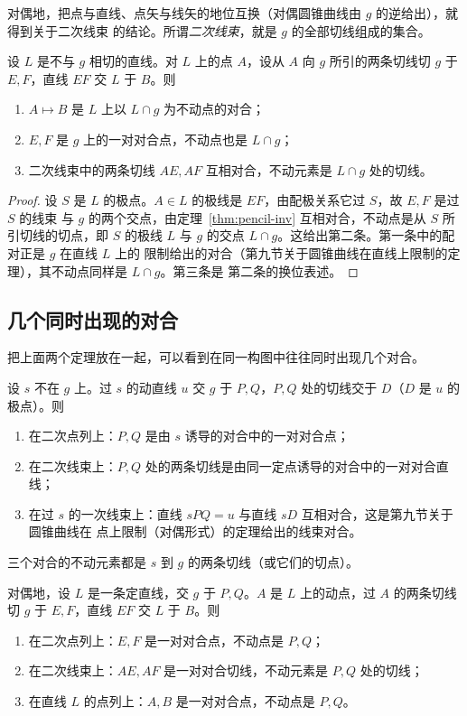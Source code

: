 对偶地，把点与直线、点矢与线矢的地位互换（对偶圆锥曲线由 $g$ 的逆给出），就得到关于二次线束
的结论。所谓\emph{二次线束}，就是 $g$ 的全部切线组成的集合。

\begin{theorem}[定直线上的点列]\label{thm:linerange-inv}
设 $L$ 是不与 $g$ 相切的直线。对 $L$ 上的点 $A$，设从 $A$ 向 $g$ 所引的两条切线切 $g$ 于
$E,F$，直线 $EF$ 交 $L$ 于 $B$。则
\begin{enumerate}
\item $A\mapsto B$ 是 $L$ 上以 $L\cap g$ 为不动点的对合；
\item $E,F$ 是 $g$ 上的一对对合点，不动点也是 $L\cap g$；
\item 二次线束中的两条切线 $AE,AF$ 互相对合，不动元素是 $L\cap g$ 处的切线。
\end{enumerate}
\end{theorem}

\begin{proof}
设 $S$ 是 $L$ 的极点。$A\in L$ 的极线是 $EF$，由配极关系它过 $S$，故 $E,F$ 是过 $S$ 的线束
与 $g$ 的两个交点，由定理~\ref{thm:pencil-inv} 互相对合，不动点是从 $S$ 所引切线的切点，即
$S$ 的极线 $L$ 与 $g$ 的交点 $L\cap g$。这给出第二条。第一条中的配对正是 $g$ 在直线 $L$ 上的
限制给出的对合（第九节关于圆锥曲线在直线上限制的定理），其不动点同样是 $L\cap g$。第三条是
第二条的换位表述。
\end{proof}

\subsection{几个同时出现的对合}

把上面两个定理放在一起，可以看到在同一构图中往往同时出现几个对合。

设 $s$ 不在 $g$ 上。过 $s$ 的动直线 $u$ 交 $g$ 于 $P,Q$，$P,Q$ 处的切线交于 $D$（$D$ 是 $u$
的极点）。则
\begin{enumerate}
\item 在二次点列上：$P,Q$ 是由 $s$ 诱导的对合中的一对对合点；
\item 在二次线束上：$P,Q$ 处的两条切线是由同一定点诱导的对合中的一对对合直线；
\item 在过 $s$ 的一次线束上：直线 $sPQ=u$ 与直线 $sD$ 互相对合，这是第九节关于圆锥曲线在
点上限制（对偶形式）的定理给出的线束对合。
\end{enumerate}
三个对合的不动元素都是 $s$ 到 $g$ 的两条切线（或它们的切点）。

对偶地，设 $L$ 是一条定直线，交 $g$ 于 $P,Q$。$A$ 是 $L$ 上的动点，过 $A$ 的两条切线切 $g$
于 $E,F$，直线 $EF$ 交 $L$ 于 $B$。则
\begin{enumerate}
\item 在二次点列上：$E,F$ 是一对对合点，不动点是 $P,Q$；
\item 在二次线束上：$AE,AF$ 是一对对合切线，不动元素是 $P,Q$ 处的切线；
\item 在直线 $L$ 的点列上：$A,B$ 是一对对合点，不动点是 $P,Q$。
\end{enumerate}

